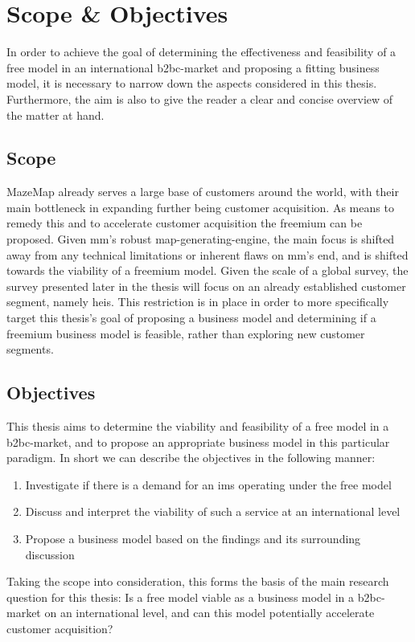 \section{Scope \& Objectives}
In order to achieve the goal of determining the effectiveness and feasibility of a free model in an international \gls{b2bc}-market and proposing a fitting business model, it is necessary to narrow down the aspects considered in this thesis. Furthermore, the aim is also to give the reader a clear and concise overview of the matter at hand.

\subsection{Scope}
MazeMap already serves a large base of customers around the world, with their main bottleneck in expanding further being customer acquisition. As means to remedy this and to accelerate customer acquisition the freemium can be proposed. Given \gls{mm}'s robust map-generating-engine, the main focus is shifted away from any technical limitations or inherent flaws on \gls{mm}'s end, and is shifted towards the viability of a freemium model. Given the scale of a global survey, the survey presented later in the thesis will focus on an already established customer segment, namely \gls{hei}s. This restriction is in place in order to more specifically target this thesis's goal of proposing a business model and determining if a freemium business model is feasible, rather than exploring new customer segments. 

\subsection{Objectives}
This thesis aims to determine the viability and feasibility of a free model in a \gls{b2bc}-market, and to propose an appropriate business model in this particular paradigm. In short we can describe the objectives in the following manner:
\begin{enumerate}
    \item Investigate if there is a demand for an \gls{ims} operating under the free model 
    \item Discuss and interpret the viability of such a service at an international level
    \item Propose a business model based on the findings and its surrounding discussion
\end{enumerate}
Taking the scope into consideration, this forms the basis of the main research question for this thesis: Is a free model viable as a business model in a \gls{b2bc}-market on an international level, and can this model potentially accelerate customer acquisition?

